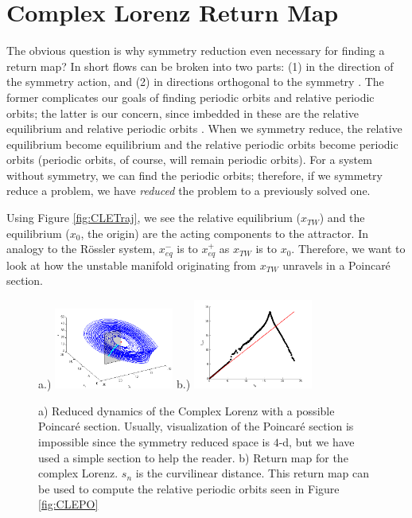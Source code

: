 \documentclass[12 pt]{article}
\begin{document}
\section{Complex Lorenz Return Map}
\label{sec:CLE}
The obvious question is why symmetry reduction even necessary for finding a return map?  In short flows can be broken into two parts: (1) in the direction of the symmetry action, and (2) in directions orthogonal to the symmetry \cite{CB, Eth, Atl}.  The former complicates our goals of finding periodic orbits and relative periodic orbits; the latter is our concern, since imbedded in these are the relative equilibrium and relative periodic orbits \cite{Atl}.  When we symmetry reduce, the relative equilibrium become equilibrium and the relative periodic orbits become periodic orbits (periodic orbits, of course, will remain periodic orbits).  For a system without symmetry, we can find the periodic orbits; therefore, if we symmetry reduce a problem, we have \emph{reduced} the problem to a previously solved one.

Using Figure \ref{fig:CLETraj}, we see the relative equilibrium ($x_{TW}$) and the equilibrium ($x_0$, the origin) are the acting components to the attractor.  In analogy to the R\"ossler system, $x_{eq}^{-}$ is to $x_{eq}^{+}$ as $x_{TW}$ is to $x_0$.  Therefore, we want to look at how the unstable manifold originating from $x_{TW}$ unravels in a Poincar\'e section.
\begin{figure}[h]
\centering
a.)  \includegraphics[width=0.35\textwidth]{Figs/Section3/kcCLEredaxisonPSc.png}
b.)
  \includegraphics[width=0.35\textwidth]{Figs/Section3/kcCLEretmap.png}
\caption{ a) Reduced dynamics of the Complex Lorenz with a possible Poincar\'e section.  Usually, visualization of the Poincar\'e section is impossible since the symmetry reduced space is $4$-d, but we have used a simple section to help the reader. b) Return map for the complex Lorenz.  $s_n$ is the curvilinear distance.  This return map can be used to compute the relative periodic orbits seen in Figure \ref{fig:CLEPO}
}
 \label{fig:CLEretmap}
\end{figure}
\end{document}
